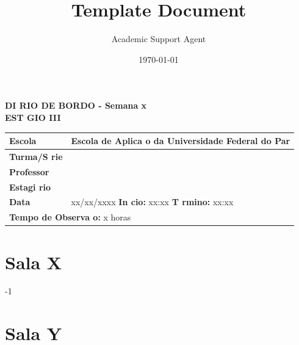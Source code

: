 \documentclass{article}
\title{Template Document}
\author{Academic Support Agent}
\date{\today}
\begin{document}
\maketitle

\begin{center}
\textbf{DI RIO DE BORDO - Semana x} \\
\vspace{0.5cm}
\textbf{EST GIO III}
\end{center}
\begin{center}
\begin{tabular}{|l|l|}
\hline
   \textbf{Escola}  &  Escola de Aplica o da Universidade Federal do Par  \hspace{3.5cm} \\
\hline  
   \textbf{Turma/S rie} & \\
\hline   
   \textbf{Professor} &  \\
\hline   
   \textbf{Estagi rio} &   \\
\hline   
   \textbf{Data} & \multicolumn{1}{l|}{ xx/xx/xxxx  \vline \textbf{ In cio: } xx:xx  \hspace{2.4cm} \vline \textbf{ T rmino: } xx:xx }\\ 
\hline   
   \multicolumn{2}{|l|}{\textbf{Tempo de Observa o:} x horas} \\
\hline   
\end{tabular}
\end{center}

\section*{Sala X}
-1
\section*{Sala Y}
\lipsum[1]
\end{document}
